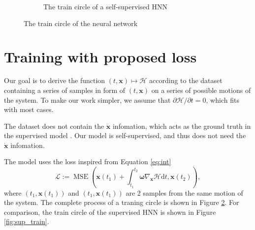 \documentclass{article}
\begin{document}
\begin{figure}[h!]
\begin{subfigure}[b]{\linewidth}
		\caption{The train circle of a self-supervised HNN}
		\label{fig:selfsup_train}
	\end{subfigure}
	\caption{The train circle of the neural network}
\end{figure}

\section{Training with proposed loss}
\label{sec:training}

Our goal is to derive the function $\left(t,\mathbf x\right)\mapsto\mathcal H$
according to the dataset containing a series of samples in form of $\left(t,\mathbf x\right)$ on a series of possible motions of the system.
To make our work simpler,
we assume that $\partial\mathcal H/\partial t=0$,
which fits with most cases.

The dataset does not contain the $\dot{\mathbf x}$ infomation,
which acts as the ground truth in the supervised model \cite{greydanus2019hamiltonian}.
Our model is self-supervised, and thus does not need the $\dot{\mathbf x}$ infomation.

The model uses the loss inspired from Equation \ref{eq:int}
\begin{equation}
	\mathcal L:=\operatorname{MSE}\left(\mathbf x\left(t_1\right)+\int_{t_1}^{t_2}\boldsymbol\omega\nabla_{\mathbf x}\mathcal H\mathrm dt,\mathbf x\left(t_2\right)\right),
\end{equation}
where $\left(t_1,\mathbf x\left(t_1\right)\right)$ and $\left(t_1,\mathbf x\left(t_1\right)\right)$
are 2 samples from the same motion of the system.
The complete process of a traning circle is shown in Figure \ref{fig:selfsup_train}.
For comparison, the train circle of the supervised HNN
is shown in Figure \ref{fig:sup_train}.
\end{document}
